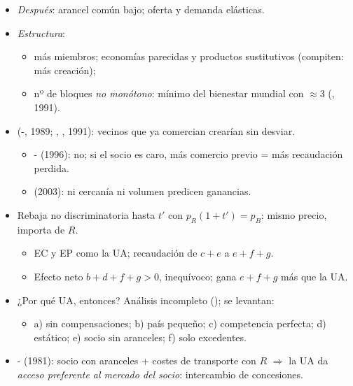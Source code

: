 \documentclass{article}
\begin{document}
\begin{columnas}
\begin{itemize}
\item \emph{Después}: arancel común bajo; oferta y demanda elásticas.
\item \emph{Estructura}:
  \begin{itemize}
  \item más miembros; economías parecidas y productos sustitutivos (compiten: más creación);
  \item nº de bloques \emph{no monótono}: mínimo del bienestar mundial con $\approx$3 (, 1991).
  \end{itemize}
\item {} (-, 1989; , , 1991): vecinos que ya comercian crearían sin desviar.
  \begin{itemize}
  \item {}- (1996): no; si el socio es caro, más comercio previo = más recaudación perdida.
  \item {} (2003): ni cercanía ni volumen predicen ganancias.
  \end{itemize}
\end{itemize}
\begin{itemize}
\item Rebaja no discriminatoria hasta $t'$ con $p_R(1+t')=p_B$: mismo precio, importa de $R$.
  \begin{itemize}
  \item EC y EP como la UA; recaudación de $c+e$ a $e+f+g$.
  \item Efecto neto $b+d+f+g>0$, inequívoco; gana $e+f+g$ más que la UA.
  \end{itemize}
\item ¿Por qué UA, entonces? Análisis incompleto (); se levantan:
  \begin{itemize}
  \item a) sin compensaciones; b) país pequeño; c) competencia perfecta; d) estático; e) socio sin aranceles; f) solo excedentes.
  \end{itemize}
\item {}- (1981): socio con aranceles + costes de transporte con $R$ $\Rightarrow$ la UA da \emph{acceso preferente al mercado del socio}: intercambio de concesiones.
\end{itemize}


\end{columnas}
\end{document}
